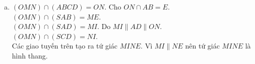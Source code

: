 \begin{ex}
{\begin{enumerate}[a.]
			      Do $J \subset(ABCD)$ và $\mathrm{d}(J, AB)=\mathrm{d}(J, CD)$ nên $J \in HK \Rightarrow IJ \subset(IHK)$.\\
			      Ta có $\heva{&IH \parallel SA \\&HK \parallel AB\\& IH \cap HK = H}$ do đó $(IHK) \parallel(SAB)$.\\
			      Vậy $\heva{&IJ \subset(IHK) \\ &(IHK) \parallel(SAB)} \Rightarrow IJ \parallel(SAB)$.
			\item $(OMN) \cap(ABCD)=ON$. Cho $ON \cap AB=E$.\\
			      $(OMN) \cap(SAB)=ME$.\\
			      $(OMN) \cap(SAD)=MI$. Do $MI \parallel AD \parallel ON$.\\
			      $(OMN) \cap(SCD)=NI$.\\
			      Các giao tuyến trên tạo ra tứ giác $MINE$. Vì $MI \parallel NE$ nên tứ giác $MINE$ là hình thang.
		\end{enumerate}
	}
\end{ex}
